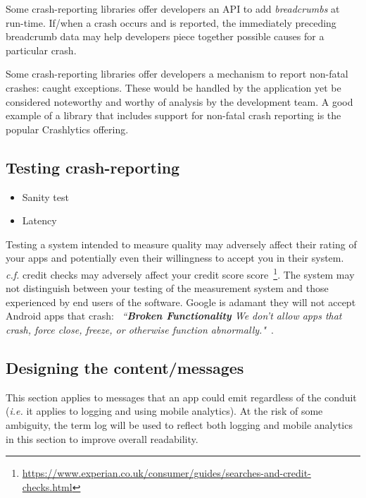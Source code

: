 Some crash-reporting libraries offer developers an API to add \emph{breadcrumbs} at run-time. If/when a crash occurs and is reported, the immediately preceding breadcrumb data may help developers piece together possible causes for a particular crash.

Some crash-reporting libraries offer developers a mechanism to report non-fatal crashes: caught exceptions. These would be handled by the application yet be considered noteworthy and worthy of analysis by the development team. A good example of a library that includes support for non-fatal crash reporting is the popular Crashlytics offering.  

\subsection{Testing crash-reporting}
\begin{itemize}
    \item Sanity test
    \item Latency
\end{itemize}

Testing a system intended to measure quality may adversely affect their rating of your apps and potentially even their willingness to accept you in their system. \emph{c.f.} credit checks may adversely affect your credit score score~\footnote{\url{https://www.experian.co.uk/consumer/guides/searches-and-credit-checks.html}}. The system may not distinguish between your testing of the measurement system and those experienced by end users of the software. Google is adamant they will not accept Android apps that crash: ~\emph{``\textbf{Broken Functionality} We don’t allow apps that crash, force close, freeze, or otherwise function abnormally."}~\cite{google_play_developer_policy_center}.


\subsection{Designing the content/messages} 
This section applies to messages that an app could emit regardless of the conduit (\emph{i.e.} it applies to logging and using mobile analytics). At the risk of some ambiguity, the term log will be used to reflect both logging and mobile analytics in this section to improve overall readability.

